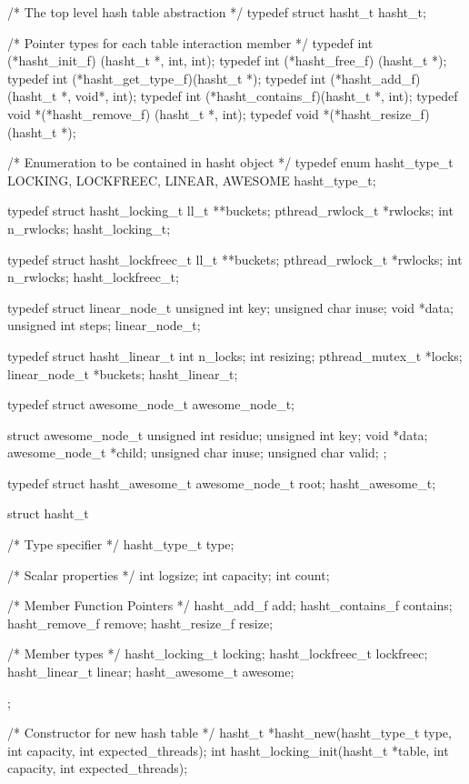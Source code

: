 \begin{code}
/* The top level hash table abstraction */
typedef struct hasht_t hasht_t;   

/* Pointer types for each table interaction member */
typedef int (*hasht_init_f)    (hasht_t *, int, int);
typedef int (*hasht_free_f)    (hasht_t *);
typedef int (*hasht_get_type_f)(hasht_t *);
typedef int (*hasht_add_f)     (hasht_t *, void*, int);
typedef int (*hasht_contains_f)(hasht_t *, int);
typedef void *(*hasht_remove_f)  (hasht_t *, int);
typedef void *(*hasht_resize_f)  (hasht_t *);

/* Enumeration to be contained in hasht object */
typedef enum hasht_type_t 
{
    LOCKING,
    LOCKFREEC,
    LINEAR,
    AWESOME
} hasht_type_t;

typedef struct hasht_locking_t
{
    ll_t **buckets;
    pthread_rwlock_t *rwlocks;
    int n_rwlocks;
} hasht_locking_t;

typedef struct hasht_lockfreec_t
{
    ll_t **buckets;
    pthread_rwlock_t *rwlocks;
    int n_rwlocks;
} hasht_lockfreec_t;

typedef struct linear_node_t{
    unsigned int key;
    unsigned char inuse;
    void *data;
    unsigned int steps;
} linear_node_t;

typedef struct hasht_linear_t
{
    int n_locks;
    int resizing;
    pthread_mutex_t *locks;
    linear_node_t *buckets;
} hasht_linear_t;

typedef struct awesome_node_t awesome_node_t;

struct awesome_node_t{
    unsigned int residue;
    unsigned int key;
    void *data;
    awesome_node_t *child;
    unsigned char inuse;
    unsigned char valid;
};

typedef struct hasht_awesome_t
{
    awesome_node_t root;
 } hasht_awesome_t;

struct hasht_t 
{
    /* Type specifier */
    hasht_type_t type;

    /* Scalar properties */
    int logsize;
    int capacity;
    int count;

    /* Member Function Pointers */
    hasht_add_f      add;
    hasht_contains_f contains;
    hasht_remove_f   remove;
    hasht_resize_f   resize;

    /* Member types */
    hasht_locking_t      locking;
    hasht_lockfreec_t    lockfreec;
    hasht_linear_t       linear;
    hasht_awesome_t      awesome;
}; 


/* Constructor for new hash table */
hasht_t *hasht_new(hasht_type_t type, int capacity, int expected_threads);
int hasht_locking_init(hasht_t *table, int capacity, int expected_threads);

\end{code}

